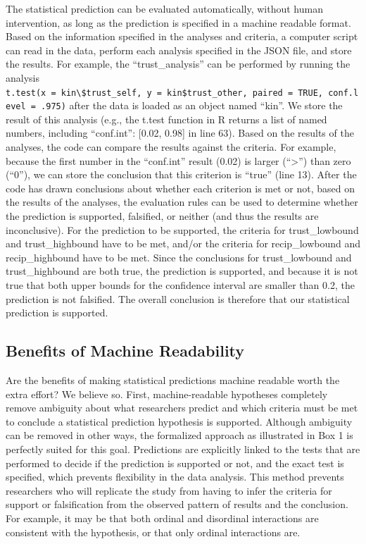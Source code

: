 \documentclass[doc,floatsintext]{apa6}
\begin{document}
The statistical prediction can be evaluated automatically, without human intervention, as long as the prediction is specified in a machine readable format. Based on the information specified in the analyses and criteria, a computer script can read in the data, perform each analysis specified in the JSON file, and store the results. For example, the ``trust\_analysis'' can be performed by running the analysis \texttt{t.test(x\ =\ kin\textbackslash{}\$trust\_self,\ y\ =\ kin\$trust\_other,\ paired\ =\ TRUE,\ conf.level\ =\ .975)} after the data is loaded as an object named ``kin''. We store the result of this analysis (e.g., the t.test function in R returns a list of named numbers, including ``conf.int'': {[}0.02, 0.98{]} in line 63). Based on the results of the analyses, the code can compare the results against the criteria. For example, because the first number in the ``conf.int'' result (0.02) is larger (``\textgreater{}'') than zero (``0''), we can store the conclusion that this criterion is ``true'' (line 13). After the code has drawn conclusions about whether each criterion is met or not, based on the results of the analyses, the evaluation rules can be used to determine whether the prediction is supported, falsified, or neither (and thus the results are inconclusive). For the prediction to be supported, the criteria for trust\_lowbound and trust\_highbound have to be met, and/or the criteria for recip\_lowbound and recip\_highbound have to be met. Since the conclusions for trust\_lowbound and trust\_highbound are both true, the prediction is supported, and because it is not true that both upper bounds for the confidence interval are smaller than 0.2, the prediction is not falsified. The overall conclusion is therefore that our statistical prediction is supported.

\hypertarget{benefits-of-machine-readability}{%
\subsection{Benefits of Machine Readability}\label{benefits-of-machine-readability}}

Are the benefits of making statistical predictions machine readable worth the extra effort? We believe so. First, machine-readable hypotheses completely remove ambiguity about what researchers predict and which criteria must be met to conclude a statistical prediction hypothesis is supported. Although ambiguity can be removed in other ways, the formalized approach as illustrated in Box 1 is perfectly suited for this goal. Predictions are explicitly linked to the tests that are performed to decide if the prediction is supported or not, and the exact test is specified, which prevents flexibility in the data analysis. This method prevents researchers who will replicate the study from having to infer the criteria for support or falsification from the observed pattern of results and the conclusion. For example, it may be that both ordinal and disordinal interactions are consistent with the hypothesis, or that only ordinal interactions are.
\end{document}
